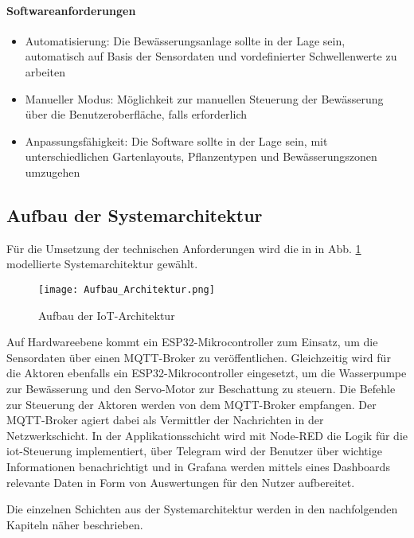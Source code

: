 \paragraph{Softwareanforderungen}
\begin{itemize}
  \item Automatisierung: Die Bewässerungsanlage sollte in der Lage sein, automatisch auf Basis der Sensordaten und vordefinierter Schwellenwerte zu arbeiten
  \item Manueller Modus: Möglichkeit zur manuellen Steuerung der Bewässerung über die Benutzeroberfläche, falls erforderlich
  \item Anpassungsfähigkeit: Die Software sollte in der Lage sein, mit unterschiedlichen Gartenlayouts, Pflanzentypen und Bewässerungszonen umzugehen
\end{itemize}


\subsection{Aufbau der Systemarchitektur}

Für die Umsetzung der technischen Anforderungen wird die in in Abb. \ref{fig:iotschichten} modellierte Systemarchitektur gewählt.

\begin{figure}[h]
  \centering
  \texttt{[image: Aufbau\_Architektur.png]}
  \caption{Aufbau der IoT-Architektur}\label{fig:iotschichten}
\end{figure}

Auf Hardwareebene kommt ein ESP32-Mikrocontroller zum Einsatz, um die Sensordaten über einen MQTT-Broker zu veröffentlichen. Gleichzeitig wird für die Aktoren ebenfalls ein ESP32-Mikrocontroller eingesetzt, um die Wasserpumpe zur Bewässerung und den Servo-Motor zur Beschattung zu steuern. Die Befehle zur Steuerung der Aktoren werden von dem MQTT-Broker empfangen. Der MQTT-Broker agiert dabei als Vermittler der Nachrichten in der Netzwerkschicht. In der Applikationsschicht wird mit Node-RED die Logik für die \gls{iot}-Steuerung implementiert, über Telegram wird der Benutzer über wichtige Informationen benachrichtigt und in Grafana werden mittels eines Dashboards relevante Daten in Form von Auswertungen für den Nutzer aufbereitet.

Die einzelnen Schichten aus der Systemarchitektur werden in den nachfolgenden Kapiteln näher beschrieben.